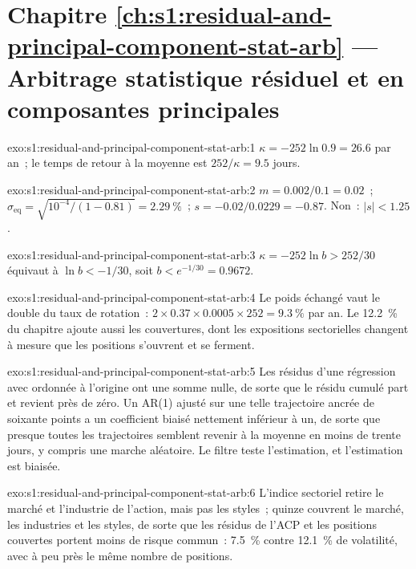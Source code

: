 \section*{Chapitre \ref{ch:s1:residual-and-principal-component-stat-arb} --- Arbitrage statistique résiduel et en composantes principales}

\begin{solution}{exo:s1:residual-and-principal-component-stat-arb:1}
$\kappa = -252 \ln 0.9 = 26.6$ par an~; le temps de retour à la moyenne est $252/\kappa = 9.5$ jours.
\end{solution}

\begin{solution}{exo:s1:residual-and-principal-component-stat-arb:2}
$m = 0.002/0.1 = 0.02$~; $\sigma_{\mathrm{eq}} = \sqrt{10^{-4}/(1 - 0.81)} = 2.29~\%$~; $s = -0.02/0.0229 = -0.87$. Non~: $|s| < 1.25$.
\end{solution}

\begin{solution}{exo:s1:residual-and-principal-component-stat-arb:3}
$\kappa = -252 \ln b > 252/30$ équivaut à $\ln b < -1/30$, soit $b < e^{-1/30} = 0.9672$.
\end{solution}

\begin{solution}{exo:s1:residual-and-principal-component-stat-arb:4}
Le poids échangé vaut le double du taux de rotation~: $2 \times 0.37 \times 0.0005 \times 252 = 9.3~\%$ par an. Le 12.2~\% du chapitre ajoute aussi les couvertures, dont les expositions sectorielles
changent à mesure que les positions s'ouvrent et se ferment.
\end{solution}

\begin{solution}{exo:s1:residual-and-principal-component-stat-arb:5}
Les résidus d'une régression avec ordonnée à l'origine ont une somme nulle, de sorte que le résidu cumulé part et revient près de zéro. Un AR(1) ajusté sur une telle trajectoire ancrée de
soixante points a un coefficient biaisé nettement inférieur à un, de sorte que presque toutes les trajectoires semblent revenir à la moyenne en moins de trente jours, y compris une marche aléatoire.
Le filtre teste l'estimation, et l'estimation est biaisée.
\end{solution}

\begin{solution}{exo:s1:residual-and-principal-component-stat-arb:6}
L'indice sectoriel retire le marché et l'industrie de l'action, mais pas les styles~; quinze  couvrent le marché, les industries et les styles, de sorte que
les résidus de l'ACP et les positions couvertes portent moins de risque commun~: 7.5~\% contre 12.1~\% de volatilité, avec à peu près le même nombre de positions.
\end{solution}

